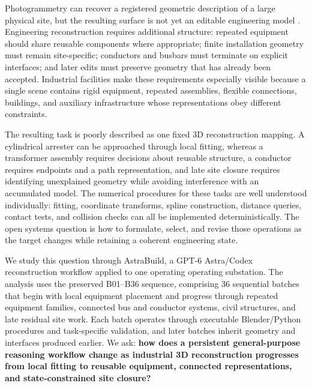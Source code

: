 \documentclass[10pt,a4paper]{article}
\begin{document}
Photogrammetry can recover a registered geometric description of a large
physical site, but the resulting surface is not yet an editable
engineering model \citep{schonberger2016sfm}. Engineering reconstruction
requires additional structure: repeated equipment should share reusable
components where appropriate; finite installation geometry must remain
site-specific; conductors and busbars must terminate on explicit
interfaces; and later edits must preserve geometry that has already been
accepted. Industrial facilities make these requirements especially
visible because a single scene contains rigid equipment, repeated
assemblies, flexible connections, buildings, and auxiliary
infrastructure whose representations obey different constraints.

The resulting task is poorly described as one fixed 3D reconstruction
mapping. A cylindrical arrester can be approached through local fitting,
whereas a transformer assembly requires decisions about reusable
structure, a conductor requires endpoints and a path representation, and
late site closure requires identifying unexplained geometry while
avoiding interference with an accumulated model. The numerical
procedures for these tasks are well understood individually: fitting,
coordinate transforms, spline construction, distance queries, contact
tests, and collision checks can all be implemented deterministically.
The open systems question is how to formulate, select, and revise those
operations as the target changes while retaining a coherent engineering
state.

We study this question through AstraBuild, a GPT-6 Astra/Codex
reconstruction workflow applied to one operating operating substation.
The analysis uses the preserved B01--B36 sequence, comprising 36
sequential batches that begin with local equipment placement and
progress through repeated equipment families, connected bus and
conductor systems, civil structures, and late residual site work. Each
batch operates through executable Blender/Python procedures and
task-specific validation, and later batches inherit geometry and
interfaces produced earlier. We ask: \textbf{how does a persistent
general-purpose reasoning workflow change as industrial 3D
reconstruction progresses from local fitting to reusable equipment,
connected representations, and state-constrained site closure?}
\end{document}
